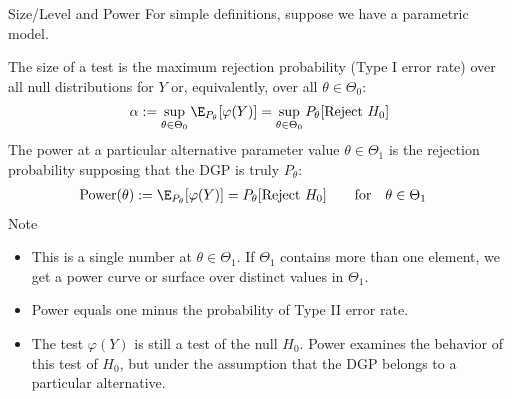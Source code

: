 \documentclass[aspectratio=169, handout]{beamer}
\begin{document}
{\footnotesize
\begin{frame}{Size/Level and Power}
For simple definitions, suppose we have a parametric model.
\pause

The \alert{size} of a test is the maximum rejection probability (Type I
error rate) over all null distributions for $Y$ or, equivalently, over
all $\theta\in\Theta_0$:
\begin{align*}
  \alpha
  :=
  \sup_{\theta\in \Theta_0}
  \E_{P_{\theta}}[\varphi(Y)]
  =
  \sup_{\theta\in \Theta_0}
  P_\theta[\text{Reject $H_0$}]
\end{align*}
\pause
The \alert{power} at a particular alternative parameter value
$\theta\in\Theta_1$ is the rejection probability supposing that the DGP
is truly $P_{\theta}$:
\begin{align}
  \text{Power}(\theta)
  &:=
  \E_{P_\theta}[\varphi(Y)]
  = P_\theta[\text{Reject $H_0$}]
  \label{power}
  \qquad \text{for}\quad
  \theta\in\Theta_1
\end{align}
\vspace{-10pt}
\pause
Note
\begin{itemize}
  \item This is a \alert{single number} at $\theta\in\Theta_1$.  If
    $\Theta_1$ contains more than one element, we get a \alert{power
    curve} or \alert{surface} over distinct values in $\Theta_1$.
  \item Power equals one minus the probability of Type II error rate.
  \item The test $\varphi(Y)$ is still a test of the null $H_0$.
    Power examines the behavior of this test of $H_0$, but under the
    assumption that the DGP belongs to a particular alternative.
\end{itemize}
\end{frame}
}
\end{document}
